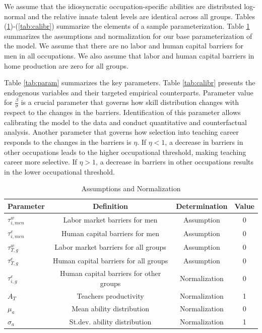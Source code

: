 \documentclass[onehalfspacing,11pt]{article}
\begin{document}
We assume that the idiosyncratic occupation-specific abilities are distributed log-normal and the relative innate talent levels are identical across all groups. Tables (\ref{tab:assump})-(\ref{tab:calibr}) summarize the elements of a sample parameterization. Table \ref{tab:assump} summarizes the assumptions and normalization for our base parameterization of the model. We assume that there are no labor and human capital barriers for men in all occupations. We also assume that labor and human capital barriers in home production are zero for all groups.

Table \ref{tab:param} summarizes the key parameters. Table \ref{tab:calibr} presents the endogenous variables and their targeted empirical counterparts. Parameter value for $\frac{\beta}{\sigma}$ is a crucial parameter that governs how skill distribution changes with respect to the changes in the barriers. Identification of this parameter allows calibrating the model to the data and conduct quantitative and counterfactual analysis. Another parameter that governs how selection into teaching career responds to the changes in the barriers is $\eta$. If $\eta<1$, a decrease in barriers in other occupations leads to the higher occupational threshold, making teaching career more selective. If $\eta>1$, a decrease in barriers in other occupations results in the lower occupational threshold.

	\begin{table}[h!]
		\centering
		\begin{tabular}{lccc}
			\toprule
			\toprule
			Parameter & Definition & Determination & Value\\
			\midrule
			$\tau^{w}_{i,men}$ & Labor market barriers for men & Assumption & 0\\
			$\tau^{e}_{i,men}$ & Human capital barriers for men & Assumption & 0\\
			$\tau^{w}_{T,g}$ & Labor market barriers for all groups & Assumption & 0\\
			$\tau^{e}_{T,g}$ & Human capital barriers for all groups & Assumption & 0\\
			$\tau^{e}_{i,g}$ & Human capital barriers for other groups & Normalization & 0\\
			$A_{T}$ & Teachers productivity & Normalization & 1\\
			$\mu_a$ & Mean ability distribution & Normalization & 0\\
			$\sigma_a$ & St.dev. ability distribution & Normalization & 1\\
			\bottomrule
		\end{tabular}
		\caption{Assumptions and Normalization}
		\label{tab:assump}
	\end{table}
	
\end{document}
